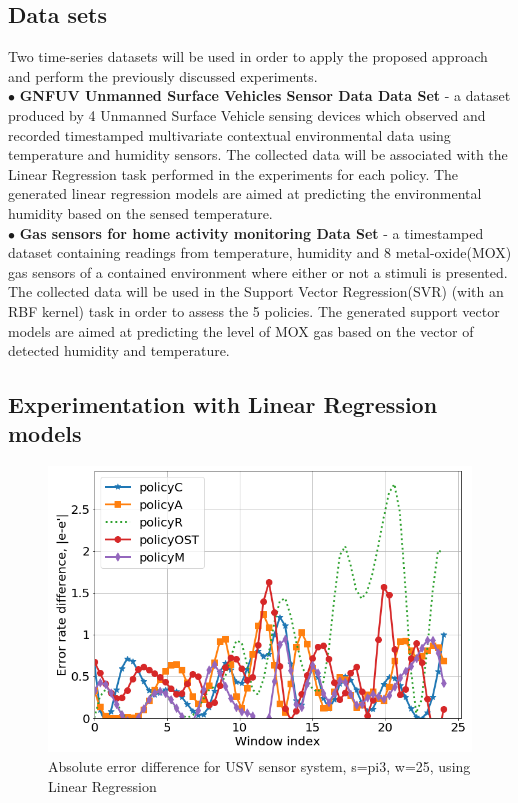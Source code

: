 \documentclass{mpaper}
\begin{document}
\subsection*{Data sets}
Two time-series datasets will be used in order to apply the proposed approach and perform the previously discussed experiments.
\\$\bullet$ \textbf{GNFUV Unmanned Surface Vehicles Sensor Data Data Set} \cite{harth2018} - a dataset produced by 4 Unmanned Surface Vehicle sensing devices which observed and recorded timestamped multivariate contextual environmental data using temperature and humidity sensors. The collected data will be associated with the Linear Regression task performed in the experiments for each policy. The generated linear regression models are aimed at predicting the environmental humidity based on the sensed temperature.
\\$\bullet$ \textbf{Gas sensors for home activity monitoring Data Set } \cite{HUERTA2016169} - a timestamped dataset containing readings from temperature, humidity and 8 metal-oxide(MOX) gas sensors of a contained environment where either or not a stimuli is presented. The collected data will be used in the Support Vector Regression(SVR) (with an RBF kernel) task in order to assess the 5 policies. The generated support vector models are aimed at predicting the level of MOX gas based on the vector of detected humidity and temperature.
\subsection{Experimentation with Linear Regression models}

\begin{figure}[h]
    \centering
    \includegraphics[scale=0.33]{imgs/lin_reg_pi3_w25.png}
    \caption{Absolute error difference for USV sensor system, s=pi3, w=25, using Linear Regression}
    \label{fig:err_lin_reg_pi3}
\end{figure}
\end{document}
